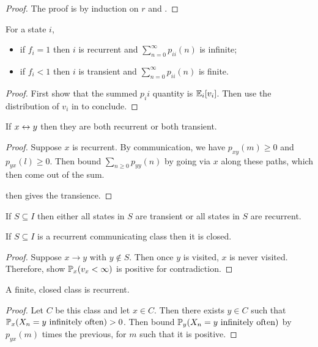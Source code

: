 \documentclass[../Main.tex]{subfiles}
\begin{document}
\begin{proof}
    The proof is by induction on $r$ and .
\end{proof}
\begin{theorem}
    For a state $i$,
    \begin{itemize}
        \item if $f_i = 1$ then $i$ is recurrent and $\sum_{n=0}^{\infty} p_{ii}(n)$ is infinite;
        \item if $f_i < 1$ then $i$ is transient and $\sum_{n=0}^{\infty} p_{ii}(n)$ is finite.
    \end{itemize}
    \label{thmRecurOrTrans}
\end{theorem}
\begin{proof}
    First show that the summed $p_ii$ quantity is $\E_i[v_i]$. Then use the distribution of $v_i$ in  to conclude.
\end{proof}
\begin{proposition}
    If $x \comms y$ then they are both recurrent or both transient.
    \label{propCommTransience}
\end{proposition}
\begin{proof}
    Suppose $x$ is recurrent. By communication, we have $p_{xy}(m) \geq 0$ and $p_{yx}(l) \geq 0$. Then bound $\sum_{n \geq 0} p_{yy}(n)$ by going via $x$ along these paths, which then come out of the sum.

     then gives the transience.
\end{proof}
\begin{corollary}
    If $S \subseteq I$ then either all states in $S$ are transient or all states in $S$ are recurrent.
    \label{corRecurIsClassProp}
\end{corollary}
\begin{proposition}
    If $S \subseteq I$ is a recurrent communicating class then it is closed.
    \label{propRecurImpliesClosed}
\end{proposition}
\begin{proof}
    Suppose $x \to y$ with $y \notin S$. Then once $y$ is visited, $x$ is never visited. Therefore, show $\P_x(v_x < \infty)$ is positive for contradiction.
\end{proof}
\begin{proposition}
    A finite, closed class is recurrent.
    \label{propFiniteClosedImpliesRecur}
\end{proposition}
\begin{proof}
    Let $C$ be this class and let $x \in C$. Then there exists $y \in C$ such that $\P_x(X_n = y \text{ infinitely often}) > 0$. Then bound $\P_y(X_n = y \text{ infinitely often})$ by $p_{yx}(m)$ times the previous, for $m$ such that it is positive.
\end{proof}
\end{document}
